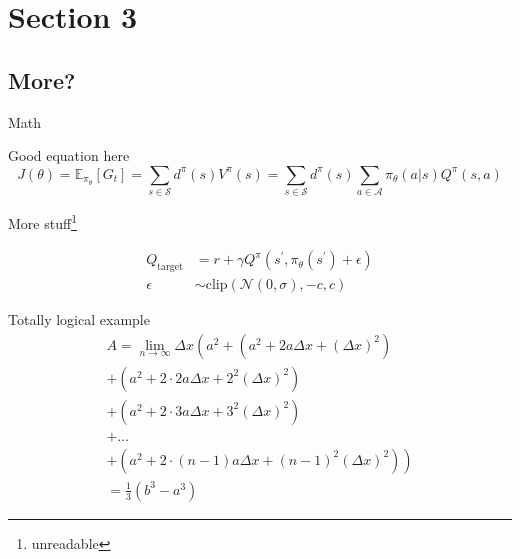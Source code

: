 \documentclass{beamer}
\begin{document}
\section{Section 3}

\subsection{More?}



\begin{frame}{Math}
    \begin{exampleblock}{Good equation here} 
        \begin{equation*}
            J(\theta) = \mathbb{E}_{\pi_\theta}[G_t] = \sum_{s\in\mathcal{S}} d^\pi (s)V^\pi(s)=\sum_{s\in\mathcal{S}} d^\pi(s)\sum_{a\in\mathcal{A}}\pi_\theta(a|s)Q^\pi(s,a)
        \end{equation*}
    \end{exampleblock}
    \begin{exampleblock}{More stuff\footnote{unreadable}}
        
        \begin{align}
            Q_\mathrm{target}&=r+\gamma Q^\pi(s^\prime, \pi_\theta(s^\prime)+\epsilon)\\
            \epsilon&\sim\mathrm{clip}(\mathcal{N}(0, \sigma), -c, c)\nonumber
        \end{align}
    \end{exampleblock}
\end{frame}

\begin{frame}
    \begin{exampleblock}{Totally logical example}
        \begin{multline}
            A=\lim_{n\rightarrow\infty}\Delta x\left(a^{2}+\left(a^{2}+2a\Delta x+\left(\Delta x\right)^{2}\right)\right.\label{eq:reset}\\
            +\left(a^{2}+2\cdot2a\Delta x+2^{2}\left(\Delta x\right)^{2}\right)\\
            +\left(a^{2}+2\cdot3a\Delta x+3^{2}\left(\Delta x\right)^{2}\right)\\
            +\ldots\\
            \left.+\left(a^{2}+2\cdot(n-1)a\Delta x+(n-1)^{2}\left(\Delta x\right)^{2}\right)\right)\\
            =\frac{1}{3}\left(b^{3}-a^{3}\right)
        \end{multline}
    \end{exampleblock}
\end{frame}
\end{document}
